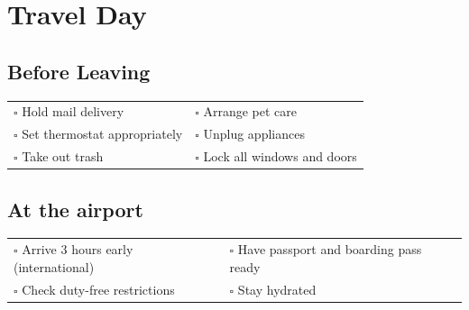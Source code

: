 
\section{Travel Day}
\label{sec:day}

\subsection{Before Leaving}

\begin{tabular}{p{9cm} p{8cm}}
$\square$ Hold mail delivery & $\square$ Arrange pet care \\ 
$\square$ Set thermostat appropriately & $\square$ Unplug appliances \\ 
$\square$ Take out trash & $\square$ Lock all windows and doors \\ 
\end{tabular}

\subsection{At the airport}

\begin{tabular}{p{9cm} p{8cm}}
$\square$ Arrive 3 hours early (international) & $\square$ Have passport and boarding pass ready \\ 
$\square$ Check duty-free restrictions & $\square$ Stay hydrated \\  
\end{tabular}

